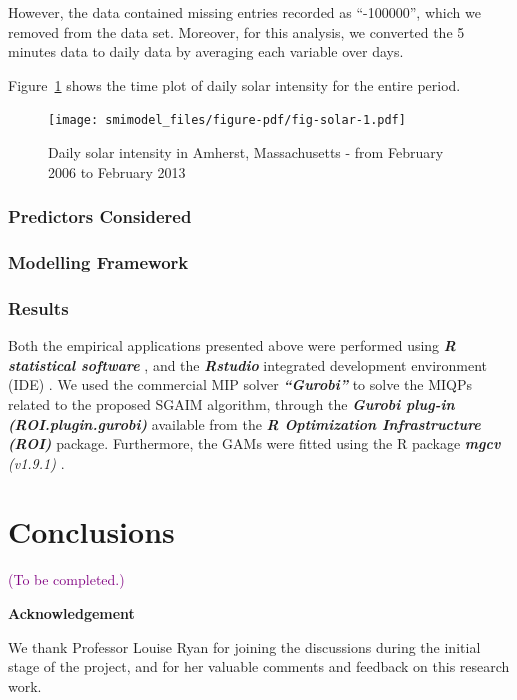 \documentclass[11pt,a4paper,]{article}
\begin{document}
However, the data contained missing entries recorded as ``-100000'',
which we removed from the data set. Moreover, for this analysis, we
converted the 5 minutes data to daily data by averaging each variable
over days.

Figure~\ref{fig-solar} shows the time plot of daily solar intensity for
the entire period.

\begin{figure}

{\centering \texttt{[image: smimodel\_files/figure-pdf/fig-solar-1.pdf]}

}

\caption{\label{fig-solar}Daily solar intensity in Amherst,
Massachusetts - from February 2006 to February 2013}

\end{figure}

\hypertarget{predictors-considered-1}{%
\subsubsection{Predictors Considered}\label{predictors-considered-1}}

\hypertarget{modelling-framework-1}{%
\subsubsection{Modelling Framework}\label{modelling-framework-1}}

\hypertarget{results-1}{%
\subsubsection{Results}\label{results-1}}

Both the empirical applications presented above were performed using
\textbf{\emph{R statistical software}} \autocite{R2023}, and the
\textbf{\emph{Rstudio}} integrated development environment (IDE)
\autocite{Rstudio2024}. We used the commercial MIP solver
\textbf{\emph{``Gurobi''}} \autocite{gurobi2023} to solve the MIQPs
related to the proposed SGAIM algorithm, through the
\textbf{\emph{Gurobi plug-in (ROI.plugin.gurobi)}}
\autocite{Schwendinger2023} available from the \textbf{\emph{R
Optimization Infrastructure (ROI)}} \autocite{Hornik2023,Theusl2020}
package. Furthermore, the GAMs were fitted using the R package
\textbf{\emph{mgcv}} \emph{(v1.9.1)} \autocite{Wood2011}.

\hypertarget{sec-conclusion}{%
\section{Conclusions}\label{sec-conclusion}}

\textcolor{purple}{(To be completed.)} \newline

\textbf{\large{Acknowledgement}}

We thank Professor Louise Ryan for joining the discussions during the
initial stage of the project, and for her valuable comments and feedback
on this research work.

\printbibliography
\end{document}
